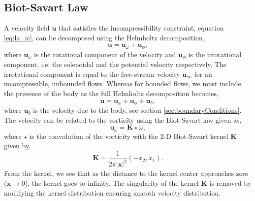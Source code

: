 \subsection{Biot-Savart Law}
A velocity field $\mathbf{u}$ that satisfies the incompressibility constraint, equation \ref{eq:la_ic}, can be decomposed using the Helmholtz decomposition,
	\begin{equation}
	\mathbf{u} = \mathbf{u}_{\omega} + \mathbf{u}_{\phi},
	\label{eq:helmholtz}
	\end{equation}
where $\mathbf{u}_{\omega}$ is the rotational component of the velocity and $\mathbf{u}_{\phi}$ is the irrotational component, i.e. the solenoidal and the potential velocity respectively. The irrotational component is equal to the free-stream velocity $\mathbf{u}_{\infty}$ for an incompressible, unbounded flows. Whereas for bounded flows, we must include the presence of the body as the full Helmholtz decomposition becomes,
\begin{equation}
\mathbf{u} = \mathbf{u}_{\omega} + \mathbf{u}_{\phi} + \mathbf{u}_{b},
\end{equation}
where $\mathbf{u}_b$ is the velocity due to the body, see section \ref{sec:boundaryConditions}. The velocity can be related to the vorticity using the Biot-Savart law given as,
	\begin{equation}
	\mathbf{u}_{\omega} = \mathbf{K}\star\omega,
	\end{equation}
where $\star$ is the convolution of the vorticity with the 2-D Biot-Savart kernel $\mathbf{K}$ given by,
	\begin{equation}
	\mathbf{K} = \frac{1}{2\pi\left|\mathbf{x}\right|^2}\left(-x_2,x_1\right).
	\label{eq:GreensKernel}
	\end{equation}
From the kernel, we see that as the distance to the kernel center approaches zero ($\mathbf{x} \rightarrow 0$), the kernel goes to infinity. The singularity of the kernel $\mathbf{K}$ is removed by mollifying the kernel distribution ensuring smooth velocity distribution.



